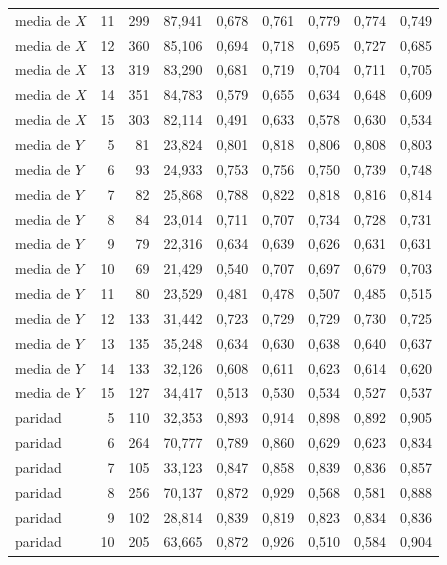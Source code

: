 \begin{table}[htbp]
{\begin{tabular}{@{}lrrrrrrrr@{}}
        media de $X$ & 11 & 299 & 87,941 & 0,678 & 0,761 & 0,779 & 0,774 & 0,749 \\
        media de $X$ & 12 & 360 & 85,106 & 0,694 & 0,718 & 0,695 & 0,727 & 0,685 \\
        media de $X$ & 13 & 319 & 83,290 & 0,681 & 0,719 & 0,704 & 0,711 & 0,705 \\
        media de $X$ & 14 & 351 & 84,783 & 0,579 & 0,655 & 0,634 & 0,648 & 0,609 \\
        media de $X$ & 15 & 303 & 82,114 & 0,491 & 0,633 & 0,578 & 0,630 & 0,534 \\
        media de $Y$ & 5 & 81 & 23,824 & 0,801 & 0,818 & 0,806 & 0,808 & 0,803 \\
        media de $Y$ & 6 & 93 & 24,933 & 0,753 & 0,756 & 0,750 & 0,739 & 0,748 \\
        media de $Y$ & 7 & 82 & 25,868 & 0,788 & 0,822 & 0,818 & 0,816 & 0,814 \\
        media de $Y$ & 8 & 84 & 23,014 & 0,711 & 0,707 & 0,734 & 0,728 & 0,731 \\
        media de $Y$ & 9 & 79 & 22,316 & 0,634 & 0,639 & 0,626 & 0,631 & 0,631 \\
        media de $Y$ & 10 & 69 & 21,429 & 0,540 & 0,707 & 0,697 & 0,679 & 0,703 \\
        media de $Y$ & 11 & 80 & 23,529 & 0,481 & 0,478 & 0,507 & 0,485 & 0,515 \\
        media de $Y$ & 12 & 133 & 31,442 & 0,723 & 0,729 & 0,729 & 0,730 & 0,725 \\
        media de $Y$ & 13 & 135 & 35,248 & 0,634 & 0,630 & 0,638 & 0,640 & 0,637 \\
        media de $Y$ & 14 & 133 & 32,126 & 0,608 & 0,611 & 0,623 & 0,614 & 0,620 \\
        media de $Y$ & 15 & 127 & 34,417 & 0,513 & 0,530 & 0,534 & 0,527 & 0,537 \\
        paridad & 5 & 110 & 32,353 & 0,893 & 0,914 & 0,898 & 0,892 & 0,905 \\
        paridad & 6 & 264 & 70,777 & 0,789 & 0,860 & 0,629 & 0,623 & 0,834 \\
        paridad & 7 & 105 & 33,123 & 0,847 & 0,858 & 0,839 & 0,836 & 0,857 \\
        paridad & 8 & 256 & 70,137 & 0,872 & 0,929 & 0,568 & 0,581 & 0,888 \\
        paridad & 9 & 102 & 28,814 & 0,839 & 0,819 & 0,823 & 0,834 & 0,836 \\
        paridad & 10 & 205 & 63,665 & 0,872 & 0,926 & 0,510 & 0,584 & 0,904 \\

\end{tabular}}
\end{table}
